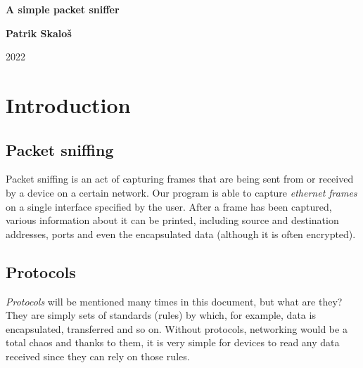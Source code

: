 \documentclass[a4paper]{article}
\begin{document}
  \begin{titlepage}

    \begin{center}

      \vspace*{5cm}

      \huge
      \textbf{A simple packet sniffer}
      
      \vspace{2cm}

      \huge
      \textbf{Patrik Skaloš}

      \vfill

      2022

    \end{center}

  \end{titlepage}


  \tableofcontents

  \newpage

  \section{Introduction}

  \subsection{Packet sniffing}

  Packet sniffing is an act of capturing frames that are being sent from or 
  received by a device on a certain network. Our program is able to capture 
  \textit{ethernet frames} on a single interface specified by the user.
  After a frame has been captured, various information about it can be printed, 
  including source and destination addresses, ports and even the encapsulated 
  data (although it is often encrypted).

  \subsection{Protocols}

  \textit{Protocols} will be mentioned many times in this document, but what 
  are they? They are simply sets of standards (rules) by which, for example, 
  data is encapsulated, transferred and so on. Without protocols, networking 
  would be a total chaos and thanks to them, it is very simple for devices to 
  read any data received since they can rely on those rules.
\end{document}
